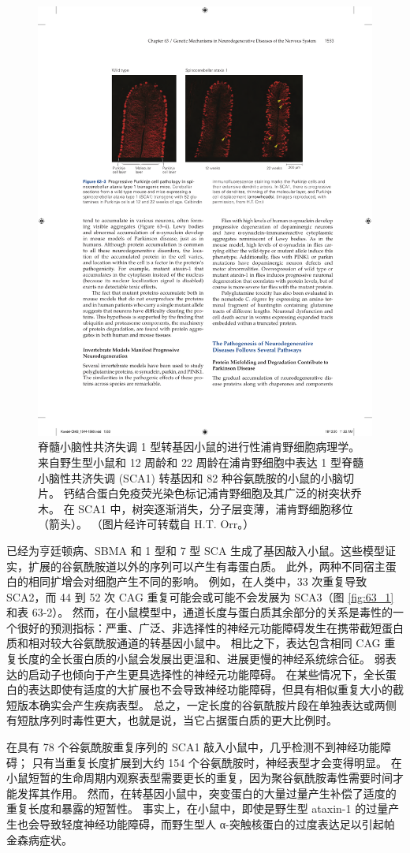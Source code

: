 \begin{figure}[htbp]
	\centering
	\includegraphics[width=0.7\linewidth]{chap63/fig_63_3}
	\caption{脊髓小脑性共济失调 1 型转基因小鼠的进行性浦肯野细胞病理学。 来自野生型小鼠和 12 周龄和 22 周龄在浦肯野细胞中表达 1 型脊髓小脑性共济失调 (SCA1) 转基因和 82 种谷氨酰胺的小鼠的小脑切片。 钙结合蛋白免疫荧光染色标记浦肯野细胞及其广泛的树突状乔木。 在 SCA1 中，树突逐渐消失，分子层变薄，浦肯野细胞移位（箭头）。 （图片经许可转载自 H.T. Orr。）}
	\label{fig:63_3}
\end{figure}

已经为亨廷顿病、SBMA 和 1 型和 7 型 SCA 生成了基因敲入小鼠。这些模型证实，扩展的谷氨酰胺道以外的序列可以产生有毒蛋白质。 此外，两种不同宿主蛋白的相同扩增会对细胞产生不同的影响。 例如，在人类中，33 次重复导致 SCA2，而 44 到 52 次 CAG 重复可能会或可能不会发展为 SCA3（图 \ref{fig:63_1} 和表 63-2）。 然而，在小鼠模型中，通道长度与蛋白质其余部分的关系是毒性的一个很好的预测指标：严重、广泛、非选择性的神经元功能障碍发生在携带截短蛋白质和相对较大谷氨酰胺通道的转基因小鼠中。 相比之下，表达包含相同 CAG 重复长度的全长蛋白质的小鼠会发展出更温和、进展更慢的神经系统综合征。 弱表达的启动子也倾向于产生更具选择性的神经元功能障碍。 在某些情况下，全长蛋白的表达即使有适度的大扩展也不会导致神经功能障碍，但具有相似重复大小的截短版本确实会产生疾病表型。 总之，一定长度的谷氨酰胺片段在单独表达或两侧有短肽序列时毒性更大，也就是说，当它占据蛋白质的更大比例时。

在具有 78 个谷氨酰胺重复序列的 SCA1 敲入小鼠中，几乎检测不到神经功能障碍； 只有当重复长度扩展到大约 154 个谷氨酰胺时，神经表型才会变得明显。 在小鼠短暂的生命周期内观察表型需要更长的重复，因为聚谷氨酰胺毒性需要时间才能发挥其作用。 然而，在转基因小鼠中，突变蛋白的大量过量产生补偿了适度的重复长度和暴露的短暂性。 事实上，在小鼠中，即使是野生型 ataxin-1 的过量产生也会导致轻度神经功能障碍，而野生型人 α-突触核蛋白的过度表达足以引起帕金森病症状。

